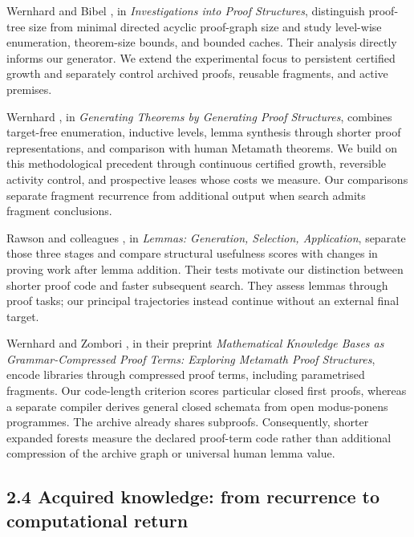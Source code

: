 \documentclass[pdflatex,sn-basic,Numbered]{sn-jnl}
\begin{document}
Wernhard and Bibel \citep{WernhardBibel2024}, in \emph{Investigations into Proof Structures}, distinguish proof-tree size from minimal directed acyclic proof-graph size and study level-wise enumeration, theorem-size bounds, and bounded caches. Their analysis directly informs our generator. We extend the experimental focus to persistent certified growth and separately control archived proofs, reusable fragments, and active premises.

Wernhard \citep{Wernhard2026}, in \emph{Generating Theorems by Generating Proof Structures}, combines target-free enumeration, inductive levels, lemma synthesis through shorter proof representations, and comparison with human Metamath theorems. We build on this methodological precedent through continuous certified growth, reversible activity control, and prospective leases whose costs we measure. Our comparisons separate fragment recurrence from additional output when search admits fragment conclusions.

Rawson and colleagues \citep{RawsonEtAl2023}, in \emph{Lemmas: Generation, Selection, Application}, separate those three stages and compare structural usefulness scores with changes in proving work after lemma addition. Their tests motivate our distinction between shorter proof code and faster subsequent search. They assess lemmas through proof tasks; our principal trajectories instead continue without an external final target.

Wernhard and Zombori \citep{WernhardZombori2025}, in their preprint \emph{Mathematical Knowledge Bases as Grammar-Compressed Proof Terms: Exploring Metamath Proof Structures}, encode libraries through compressed proof terms, including parametrised fragments. Our code-length criterion scores particular closed first proofs, whereas a separate compiler derives general closed schemata from open modus-ponens programmes. The archive already shares subproofs. Consequently, shorter expanded forests measure the declared proof-term code rather than additional compression of the archive graph or universal human lemma value.

\subsection*{2.4 Acquired knowledge: from recurrence to computational return}\label{acquired-knowledge-from-recurrence-to-computational-return}
\end{document}
